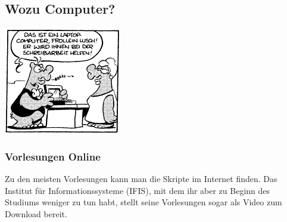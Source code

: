 \subsection{Wozu Computer?}
 \begin{center}
 \includegraphics[width = 0.75\linewidth]{bilder/comics/otto1_1.png}
 \end{center}
\subsubsection{Vorlesungen Online}
Zu den meisten Vorlesungen kann man die Skripte im Internet finden. Das Institut 
für Informationssysteme (IFIS), mit dem ihr aber zu Beginn des Studiums 
weniger zu tun habt, stellt seine Vorlesungen sogar als Video zum Download bereit.



